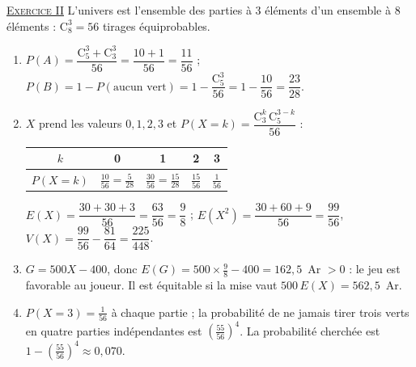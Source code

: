 \begin{corrige}
\noindent \underline{\textsc{Exercice II}} \newline
L'univers est l'ensemble des parties \`a 3 \'el\'ements d'un ensemble \`a 8 \'el\'ements : $\mathrm{C}_8^3 = 56$ tirages \'equiprobables.
\begin{enumerate}
\item $P(A) = \dfrac{\mathrm{C}_5^3 + \mathrm{C}_3^3}{56} = \dfrac{10 + 1}{56} = \dfrac{11}{56}$ ;
      $P(B) = 1 - P(\text{aucun vert}) = 1 - \dfrac{\mathrm{C}_5^3}{56} = 1 - \dfrac{10}{56} = \dfrac{23}{28}$.
\item $X$ prend les valeurs $0, 1, 2, 3$ et $P(X = k) = \dfrac{\mathrm{C}_3^k\,\mathrm{C}_5^{3-k}}{56}$ :
      \begin{center}
      \begin{tabular}{|c|c|c|c|c|}
      \hline
      $k$ & 0 & 1 & 2 & 3 \\ \hline
      $P(X = k)$ & $\frac{10}{56} = \frac{5}{28}$ & $\frac{30}{56} = \frac{15}{28}$ & $\frac{15}{56}$ & $\frac{1}{56}$ \\ \hline
      \end{tabular}
      \end{center}
      $E(X) = \dfrac{30 + 30 + 3}{56} = \dfrac{63}{56} = \dfrac{9}{8}$ ;
      $E(X^2) = \dfrac{30 + 60 + 9}{56} = \dfrac{99}{56}$, $V(X) = \dfrac{99}{56} - \dfrac{81}{64} = \dfrac{225}{448}$.
\item $G = 500X - 400$, donc $E(G) = 500 \times \frac{9}{8} - 400 = 162{,}5$~Ar $> 0$ : le jeu est favorable au joueur.
      Il est \'equitable si la mise vaut $500\,E(X) = 562{,}5$~Ar.
\item $P(X = 3) = \frac{1}{56}$ \`a chaque partie ; la probabilit\'e de ne jamais tirer trois verts en quatre parties
      ind\'ependantes est $\left(\frac{55}{56}\right)^4$. La probabilit\'e cherch\'ee est $1 - \left(\frac{55}{56}\right)^4 \approx 0{,}070$.
\end{enumerate}


\end{corrige}
